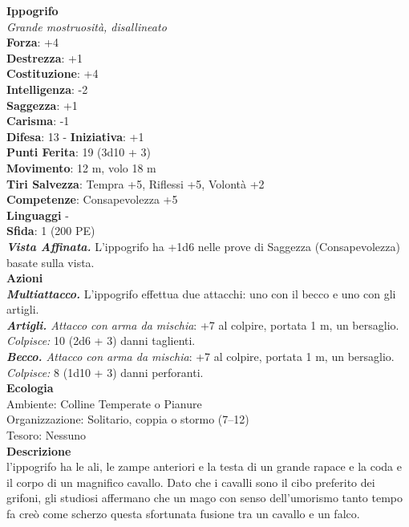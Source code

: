 \begin{multicols}{2}
\medskip\textbf{Ippogrifo}\\
\emph{Grande mostruosità, disallineato}\\
\textbf{Forza}: +4\\
\textbf{Destrezza}: +1\\
\textbf{Costituzione}: +4\\
\textbf{Intelligenza}: -2\\
\textbf{Saggezza}: +1\\
\textbf{Carisma}: -1\\
\textbf{Difesa}: 13 - \textbf{Iniziativa}: +1\\
\textbf{Punti Ferita}: 19 (3d10 + 3)\\
\textbf{Movimento}: 12 m, volo 18 m\\
\textbf{Tiri Salvezza}: Tempra +5, Riflessi +5, Volontà +2\\
\textbf{Competenze}: Consapevolezza +5\\
\textbf{Linguaggi} -\\
\textbf{Sfida}: 1 (200 PE)\smallskip\\
\emph{\textbf{Vista Affinata.}} L'ippogrifo ha +1d6 nelle prove di Saggezza (Consapevolezza) basate sulla vista.\\
\smallskip\textbf{Azioni}\\
\emph{\textbf{Multiattacco.}} L'ippogrifo effettua due attacchi: uno con il becco e uno con gli artigli.\\
\emph{\textbf{Artigli.} Attacco con arma da mischia}: +7 al colpire, portata 1 m, un bersaglio.\\
\emph{Colpisce:} 10 (2d6 + 3) danni taglienti.\\
\emph{\textbf{Becco.} Attacco con arma da mischia}: +7 al colpire, portata 1 m, un bersaglio.\\
\emph{Colpisce:} 8 (1d10 + 3) danni perforanti. \\
\textbf{Ecologia}\\
Ambiente: Colline Temperate o Pianure\\
Organizzazione: Solitario, coppia o stormo (7–12)\\
Tesoro: Nessuno\\
\textbf{Descrizione}\\
l'ippogrifo ha le ali, le zampe anteriori e la testa di un grande rapace e la coda e il corpo di un magnifico cavallo. Dato che i cavalli sono il cibo preferito dei grifoni, gli studiosi affermano che un mago con senso dell'umorismo tanto tempo fa creò come scherzo questa sfortunata fusione tra un cavallo e un falco.\\


\end{multicols}
